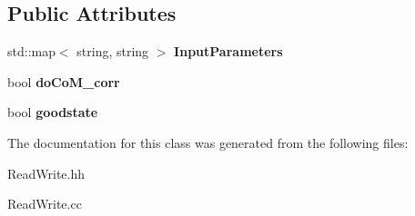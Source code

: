 \subsection*{Public Attributes}
\begin{DoxyCompactItemize}
\item 
\hypertarget{classReadWrite_aa99ba50a35d8391285c1bdde1f1c206d}{std\-::map$<$ string, string $>$ {\bfseries Input\-Parameters}}\label{classReadWrite_aa99ba50a35d8391285c1bdde1f1c206d}

\item 
\hypertarget{classReadWrite_a3221f4b824dc385b066eca732339ee72}{bool {\bfseries do\-Co\-M\-\_\-corr}}\label{classReadWrite_a3221f4b824dc385b066eca732339ee72}

\item 
\hypertarget{classReadWrite_aaf2753e15a5e7f524d6fde9f15ab357b}{bool {\bfseries goodstate}}\label{classReadWrite_aaf2753e15a5e7f524d6fde9f15ab357b}

\end{DoxyCompactItemize}


The documentation for this class was generated from the following files\-:\begin{DoxyCompactItemize}
\item 
Read\-Write.\-hh\item 
Read\-Write.\-cc\end{DoxyCompactItemize}
